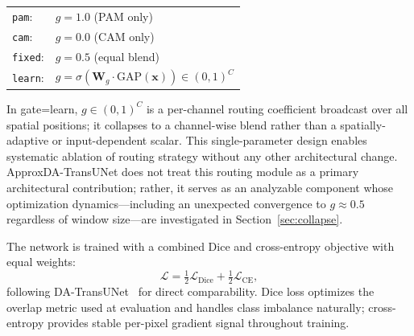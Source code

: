 \begin{center}
\small
\begin{tabular}{@{}ll@{}}
\texttt{pam}:   & $g = 1.0$ \quad (PAM only) \\
\texttt{cam}:   & $g = 0.0$ \quad (CAM only) \\
\texttt{fixed}: & $g = 0.5$ \quad (equal blend) \\
\texttt{learn}: & $g = \sigma(\mathbf{W}_g \cdot \mathrm{GAP}(\mathbf{x})) \in (0,1)^C$ \\
\end{tabular}
\end{center}

In gate=learn, $g \in (0,1)^C$ is a per-channel routing coefficient broadcast over all spatial positions; it collapses to a channel-wise blend rather than a spatially-adaptive or input-dependent scalar. This single-parameter design enables systematic ablation of routing strategy without any other architectural change. ApproxDA-TransUNet does not treat this routing module as a primary architectural contribution; rather, it serves as an analyzable component whose optimization dynamics---including an unexpected convergence to $g{\approx}0.5$ regardless of window size---are investigated in Section~\ref{sec:collapse}.

The network is trained with a combined Dice and cross-entropy objective with equal weights:
\begin{equation}
  \mathcal{L} = \tfrac{1}{2}\mathcal{L}_{\text{Dice}} + \tfrac{1}{2}\mathcal{L}_{\text{CE}},
  \label{eq:loss}
\end{equation}
following DA-TransUNet~\cite{sun2024datransunet} for direct comparability. Dice loss optimizes the overlap metric used at evaluation and handles class imbalance naturally; cross-entropy provides stable per-pixel gradient signal throughout training.

